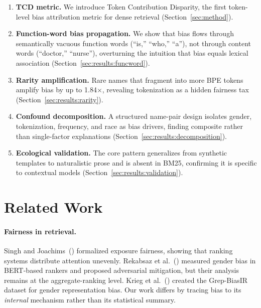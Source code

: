 \documentclass[sigconf,review,anonymous]{acmart}
\begin{document}
\begin{enumerate}
\item \textbf{TCD metric.} We introduce Token Contribution Disparity, the first token-level bias attribution metric for dense retrieval (Section~\ref{sec:method}).

\item \textbf{Function-word bias propagation.} We show that bias flows through semantically vacuous function words (``is,'' ``who,'' ``a''), not through content words (``doctor,'' ``nurse''), overturning the intuition that bias equals lexical association (Section~\ref{sec:results:funcword}).

\item \textbf{Rarity amplification.} Rare names that fragment into more BPE tokens amplify bias by up to 1.84$\times$, revealing tokenization as a hidden fairness tax (Section~\ref{sec:results:rarity}).

\item \textbf{Confound decomposition.} A structured name-pair design isolates gender, tokenization, frequency, and race as bias drivers, finding composite rather than single-factor explanations (Section~\ref{sec:results:decomposition}).

\item \textbf{Ecological validation.} The core pattern generalizes from synthetic templates to naturalistic prose and is absent in BM25, confirming it is specific to contextual models (Section~\ref{sec:results:validation}).
\end{enumerate}


\section{Related Work}
\label{sec:related}

\paragraph{Fairness in retrieval.}
Singh and Joachims~(\citeyear{singh2018}) formalized exposure fairness, showing that ranking systems distribute attention unevenly. Rekabsaz et al.~(\citeyear{rekabsaz2021}) measured gender bias in BERT-based rankers and proposed adversarial mitigation, but their analysis remains at the aggregate-ranking level. Krieg et al.~(\citeyear{krieg2023}) created the Grep-BiasIR dataset for gender representation bias. Our work differs by tracing bias to its \emph{internal} mechanism rather than its statistical summary.
\end{document}
